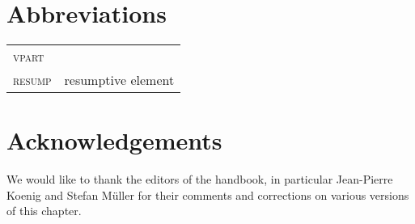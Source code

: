 \documentclass[output=paper
,notxmath 
 	        ,biblatex
                ,babelshorthands
                ,newtxmath
                ,draftmode
                ,colorlinks, citecolor=brown
]{langscibook}
\begin{document}
\section*{Abbreviations}


\begin{tabularx}{.99\textwidth}{@{}lX}
\textsc{vpart} & \\
\textsc{resump} & resumptive element \\
\end{tabularx}



\section*{Acknowledgements}

We would like to thank the editors of the handbook, in particular
Jean-Pierre Koenig and Stefan Müller for their comments and
corrections on various versions of this chapter. 





 

{\sloppy
\printbibliography[heading=subbibliography,notkeyword=this]
}
\end{document}
